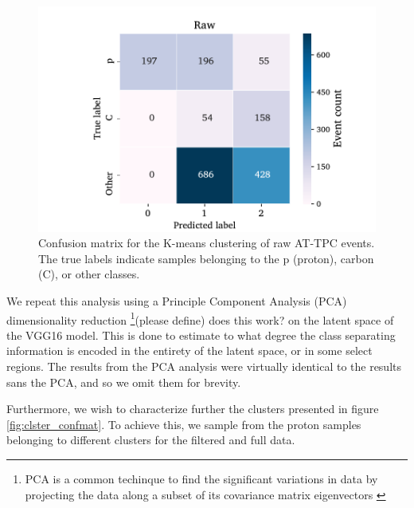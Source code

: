 \documentclass[review,number,sort&compress]{elsarticle}
\begin{document}
\begin{figure}
	\includegraphics[width=\textwidth]{custom_work/Rawvgg_conf_mat.pdf}
\caption[Pre-trained network - confusion matrices]{Confusion matrix for the K-means clustering of raw AT-TPC events. The true labels indicate samples belonging to the p (proton), carbon (C), or other classes. }\label{fig:clster_confmati_raw}
\end{figure}

We repeat this analysis using a Principle Component Analysis (PCA) dimensionality reduction \footnote{
PCA is a common techinque to find the significant variations in data by projecting the data along a subset of its covariance matrix eigenvectors \cite{Marsland2009}
}{\color{green}(please define)} {\color{orange} does this work?} on the latent space of the VGG16 model. This is done to estimate to what degree the class separating information is encoded in the entirety of the latent space, or in some select regions. The results from the PCA analysis were virtually identical to the results sans the PCA, and so we omit them for brevity. 

Furthermore, we wish to characterize further the clusters presented in figure \ref{fig:clster_confmat}. To achieve this, we sample from the proton samples belonging to different clusters for the filtered and full data.
\end{document}
